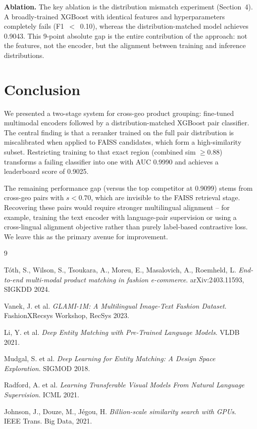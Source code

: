 \documentclass[10pt,twocolumn]{article}
\begin{document}
\textbf{Ablation.}
The key ablation is the distribution mismatch experiment (Section~4).
A broadly-trained XGBoost with identical features and hyperparameters
completely fails (F1~$<$~0.10), whereas the distribution-matched model
achieves 0.9043. This 9-point absolute gap is the entire contribution
of the approach: not the features, not the encoder, but the alignment
between training and inference distributions.

\section{Conclusion}

We presented a two-stage system for cross-geo product grouping: fine-tuned
multimodal encoders followed by a distribution-matched XGBoost pair
classifier. The central finding is that a reranker trained on the full pair
distribution is miscalibrated when applied to FAISS candidates, which form
a high-similarity subset. Restricting training to that exact region
(combined sim $\geq 0.88$) transforms a failing classifier into one with
AUC 0.9990 and achieves a leaderboard score of 0.9025.

The remaining performance gap (versus the top competitor at 0.9099) stems
from cross-geo pairs with $s < 0.70$, which are invisible to the FAISS
retrieval stage. Recovering these pairs would require stronger multilingual
alignment -- for example, training the text encoder with language-pair
supervision or using a cross-lingual alignment objective rather than purely
label-based contrastive loss. We leave this as the primary avenue for
improvement.


\begin{thebibliography}{9}

Tóth, S., Wilson, S., Tsoukara, A., Moreu, E., Masalovich, A., Roemheld, L.
\textit{End-to-end multi-modal product matching in fashion e-commerce}.
arXiv:2403.11593, SIGKDD 2024.

Vanek, J. et al.
\textit{GLAMI-1M: A Multilingual Image-Text Fashion Dataset}.
FashionXRecsys Workshop, RecSys 2023.

Li, Y. et al.
\textit{Deep Entity Matching with Pre-Trained Language Models}.
VLDB 2021.

Mudgal, S. et al.
\textit{Deep Learning for Entity Matching: A Design Space Exploration}.
SIGMOD 2018.

Radford, A. et al.
\textit{Learning Transferable Visual Models From Natural Language Supervision}.
ICML 2021.

Johnson, J., Douze, M., Jégou, H.
\textit{Billion-scale similarity search with GPUs}.
IEEE Trans. Big Data, 2021.

\end{thebibliography}
\end{document}
